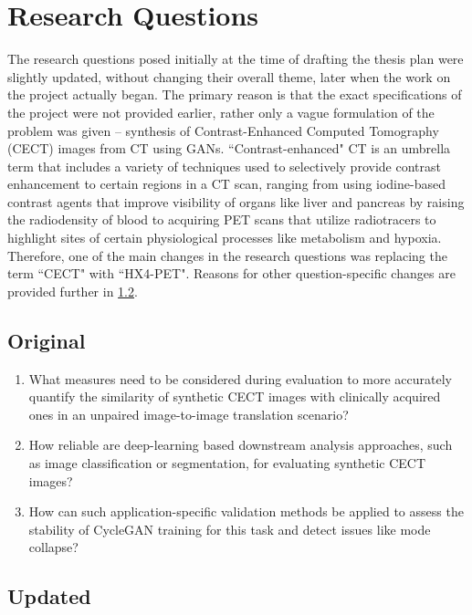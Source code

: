 \section{Research Questions}
The research questions posed initially at the time of drafting the thesis plan were slightly updated, without changing their overall theme, later when the work on the project actually began. The primary reason is that the exact specifications of the project were not provided earlier, rather only a vague formulation of the problem was given -- synthesis of Contrast-Enhanced Computed Tomography (CECT) images from CT using GANs. ``Contrast-enhanced" CT is an umbrella term that includes a variety of techniques used to selectively provide contrast enhancement to certain regions in a CT scan, ranging from using iodine-based contrast agents that improve visibility of organs like liver and pancreas by raising the radiodensity of blood to acquiring PET scans that utilize radiotracers to highlight sites of certain physiological processes like metabolism and hypoxia. Therefore, one of the main changes in the research questions was replacing the term ``CECT" with ``HX4-PET". Reasons for other question-specific changes are provided further in \ref{updated_research_questions}.


\subsection{Original}
\begin{enumerate}
    \item What measures need to be considered during evaluation to more accurately quantify the similarity of synthetic CECT images with clinically acquired ones in an unpaired image-to-image translation scenario?
    \item How reliable are deep-learning based downstream analysis approaches, such as image classification or segmentation, for evaluating synthetic CECT images?
    \item How can such application-specific validation methods be applied to assess the stability of CycleGAN training for this task and detect issues like mode collapse?
\end{enumerate}


\subsection{Updated}
\label{updated_research_questions}

